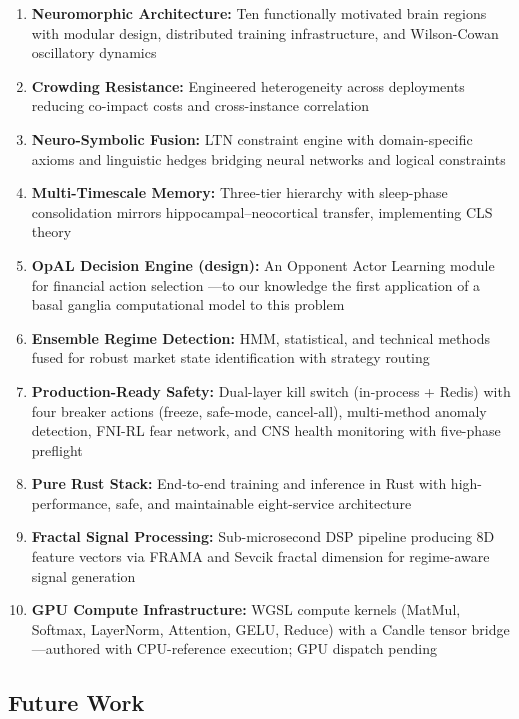 \documentclass[12pt, a4paper]{article}
\begin{document}
\begin{enumerate}
	\item \textbf{Neuromorphic Architecture:} Ten functionally motivated brain regions with modular design, distributed training infrastructure, and Wilson-Cowan oscillatory dynamics \citep{doya1999computations, caligiore2019superlearning}
	\item \textbf{Crowding Resistance:} Engineered heterogeneity across deployments reducing co-impact costs and cross-instance correlation \citep{wagner2011diversity, demiguel2021crowding}
	\item \textbf{Neuro-Symbolic Fusion:} LTN constraint engine with domain-specific axioms and linguistic hedges bridging neural networks and logical constraints \citep{badreddine2022logic}
	\item \textbf{Multi-Timescale Memory:} Three-tier hierarchy with sleep-phase consolidation mirrors hippocampal--neocortical transfer, implementing CLS theory \citep{kumaran2016cls, masset2025multitimescale}
	\item \textbf{OpAL Decision Engine (design):} An Opponent Actor Learning module for financial action selection \citep{collins2014opponent, jaskir2023opal}---to our knowledge the first application of a basal ganglia computational model to this problem
	\item \textbf{Ensemble Regime Detection:} HMM, statistical, and technical methods fused for robust market state identification with strategy routing
	\item \textbf{Production-Ready Safety:} Dual-layer kill switch (in-process + Redis) with four breaker actions (freeze, safe-mode, cancel-all), multi-method anomaly detection, FNI-RL fear network, and CNS health monitoring with five-phase preflight
	\item \textbf{Pure Rust Stack:} End-to-end training and inference in Rust \citep{matsakis2014rust} with high-performance, safe, and maintainable eight-service architecture
	\item \textbf{Fractal Signal Processing:} Sub-microsecond DSP pipeline producing 8D feature vectors via FRAMA and Sevcik fractal dimension for regime-aware signal generation
	\item \textbf{GPU Compute Infrastructure:} WGSL compute kernels (MatMul, Softmax, LayerNorm, Attention, GELU, Reduce) with a Candle tensor bridge---authored with CPU-reference execution; GPU dispatch pending
\end{enumerate}

\subsection{Future Work}
\end{document}
